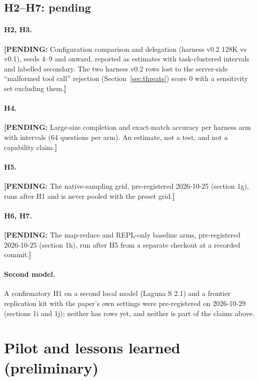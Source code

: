 \documentclass[11pt]{article}
\newcommand{\PENDING}[1]{\textcolor{orange!80!black}{\textbf{[PENDING:} #1\textbf{]}}}
\begin{document}
\subsection{H2--H7: pending}
\label{sec:pending}

\paragraph{H2, H3.} \PENDING{Configuration comparison and delegation (harness v0.2 128K
vs v0.1), seeds 4--9 and onward, reported as estimates with task-clustered intervals and
labelled secondary. The two harness v0.2 rows lost to the server-side ``malformed tool
call'' rejection (Section~\ref{sec:threats}) score 0 with a sensitivity set excluding
them.}

\paragraph{H4.} \PENDING{Large-size completion and exact-match accuracy per harness
arm with intervals (64 questions per arm). An estimate, not a test, and not a capability
claim.}

\paragraph{H5.} \PENDING{The native-sampling grid, pre-registered 2026-10-25 (section
1g), runs after H1 and is never pooled with the preset grid.}

\paragraph{H6, H7.} \PENDING{The map-reduce and REPL-only baseline arms, pre-registered
2026-10-25 (section 1h), run after H5 from a separate checkout at a recorded commit.}

\paragraph{Second model.} A confirmatory H1 on a second local model (Laguna S 2.1) and
a frontier replication kit with the paper's own settings were pre-registered on
2026-10-29 (sections 1i and 1j); neither has rows yet, and neither is part of the claims
above.

\section{Pilot and lessons learned (preliminary)}
\label{sec:lessons}
\end{document}

